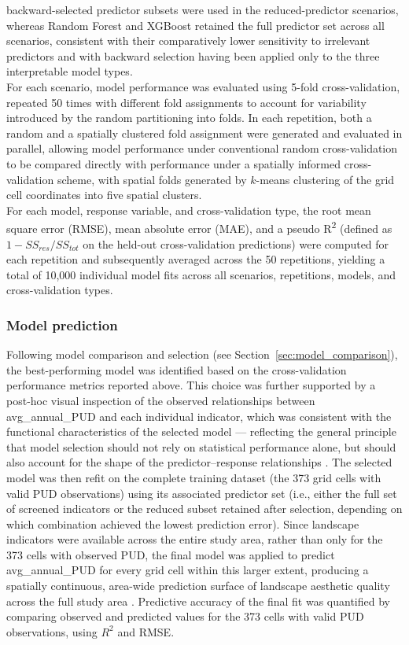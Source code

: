 \documentclass[hidelinks, 11pt]{article}
\begin{document}
backward-selected predictor subsets were used in the reduced-predictor
scenarios, whereas Random Forest and XGBoost retained the full predictor
set across all scenarios, consistent with their comparatively lower
sensitivity to irrelevant predictors and with backward selection having
been applied only to the three interpretable model types.
\\
For each scenario, model performance was evaluated using 5-fold
cross-validation, repeated 50 times with different fold assignments to
account for variability introduced by the random partitioning into folds.
In each repetition, both a random and a spatially clustered fold
assignment were generated and evaluated in parallel, allowing model
performance under conventional random cross-validation to be compared
directly with performance under a spatially informed cross-validation
scheme, with spatial folds generated by $k$-means clustering of the grid
cell coordinates into five spatial clusters.
\\
For each model, response variable, and cross-validation type, the root
mean square error (RMSE), mean absolute error (MAE), and a pseudo
R\textsuperscript{2} (defined as $1 - SS_{res}/SS_{tot}$ on the held-out
cross-validation predictions) were computed for each repetition and
subsequently averaged across the 50 repetitions, yielding a total of
10,000 individual model fits across all scenarios, repetitions, models,
and cross-validation types.

\subsubsection{Model prediction}

Following model comparison and selection (see Section~\ref{sec:model_comparison}), the best-performing model was identified based on the cross-validation performance metrics reported above. This choice was further supported by a post-hoc visual inspection of the observed relationships between avg\_annual\_PUD and each individual indicator, which was consistent with the functional characteristics of the selected model --- reflecting the general principle that model selection should not rely on statistical performance alone, but should also account for the shape of the predictor--response relationships \citep{guisan2000predictive}. The selected model was then refit on the complete training dataset (the 373 grid cells with valid PUD observations) using its associated predictor set (i.e., either the full set of screened indicators or the reduced subset retained after selection, depending on which combination achieved the lowest prediction error). Since landscape indicators were available across the entire study area, rather than only for the 373 cells with observed PUD, the final model was applied to predict avg\_annual\_PUD for every grid cell within this larger extent, producing a spatially continuous, area-wide prediction surface of landscape aesthetic quality across the full study area \citep{guisan2000predictive}. Predictive accuracy of the final fit was quantified by comparing observed and predicted values for the 373 cells with valid PUD observations, using $R^2$ and RMSE.
\end{document}
